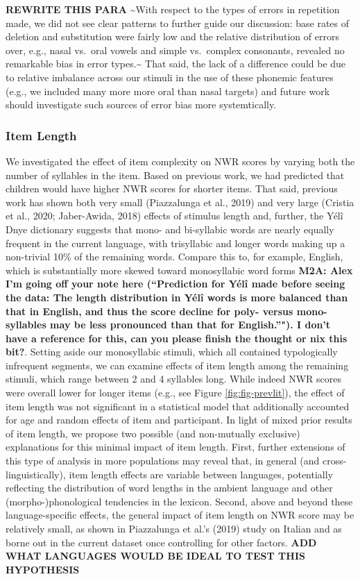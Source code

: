 \documentclass[english,,man,floatsintext]{apa6}
\begin{document}
\textbf{REWRITE THIS PARA} \textasciitilde{}With respect to the types of errors in repetition made, we did not see clear patterns to further guide our discussion: base rates of deletion and substitution were fairly low and the relative distribution of errors over, e.g., nasal vs.~oral vowels and simple vs.~complex consonants, revealed no remarkable bias in error types.\textasciitilde{} That said, the lack of a difference could be due to relative imbalance across our stimuli in the use of these phonemic features (e.g., we included many more more oral than nasal targets) and future work should investigate such sources of error bias more systemtically.

\hypertarget{item-length}{%
\subsubsection{Item Length}\label{item-length}}

We investigated the effect of item complexity on NWR scores by varying both the number of syllables in the item. Based on previous work, we had predicted that children would have higher NWR scores for shorter items. That said, previous work has shown both very small (Piazzalunga et al., 2019) and very large (Cristia et al., 2020; Jaber-Awida, 2018) effects of stimulus length and, further, the Yélî Dnye dictionary suggests that mono- and bi-syllabic words are nearly equally frequent in the current language, with trisyllabic and longer words making up a non-trivial 10\% of the remaining words. Compare this to, for example, English, which is substantially more skewed toward monosyllabic word forms \textbf{M2A: Alex I'm going off your note here (\enquote{Prediction for Yélî made before seeing the data: The length distribution in Yélî words is more balanced than that in English, and thus the score decline for poly- versus mono-syllables may be less pronounced than that for English.}"). I don't have a reference for this, can you please finish the thought or nix this bit?}. Setting aside our monosyllabic stimuli, which all contained typologically infrequent segments, we can examine effects of item length among the remaining stimuli, which range between 2 and 4 syllables long. While indeed NWR scores were overall lower for longer items (e.g., see Figure \ref{fig:fig-prevlit}), the effect of item length was not significant in a statistical model that additionally accounted for age and random effects of item and participant. In light of mixed prior results of item length, we propose two possible (and non-mutually exclusive) explanations for this minimal impact of item length. First, further extensions of this type of analysis in more populations may reveal that, in general (and cross-linguistically), item length effects are variable between languages, potentially reflecting the distribution of word lengths in the ambient language and other (morpho-)phonological tendencies in the lexicon. Second, above and beyond these language-specific effects, the general impact of item length on NWR score may be relatively small, as shown in Piazzalunga et al.'s (2019) study on Italian and as borne out in the current dataset once controlling for other factors. \textbf{ADD WHAT LANGUAGES WOULD BE IDEAL TO TEST THIS HYPOTHESIS}
\end{document}
